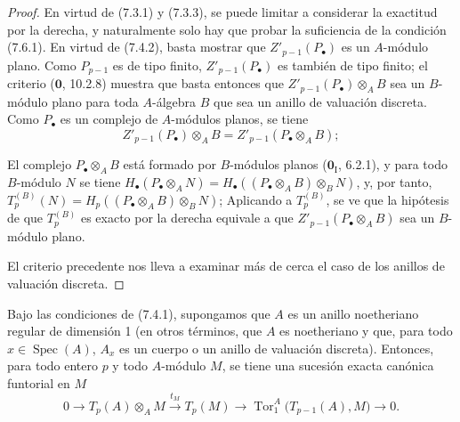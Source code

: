 \begin{proof}
En virtud de (7.3.1) y (7.3.3), se puede limitar a considerar la exactitud por la
derecha, y naturalmente solo hay que probar la suficiencia de la condición
(7.6.1). En virtud de (7.4.2), basta mostrar que
$Z'_{p-1}(P_\bullet)$ es un
$A$-módulo plano. Como $P_{p-1}$ es de tipo finito,
$Z'_{p-1}(P_\bullet)$ es también de tipo finito; el criterio ($\mathbf{0}$, 10.2.8) muestra
que basta entonces que $Z'_{p-1}(P_\bullet)\otimes_A B$
sea un $B$-módulo plano para toda $A$-álgebra $B$ que sea un anillo
de valuación discreta. Como $P_\bullet$ es un complejo de
$A$-módulos planos, se tiene
\[
  Z'_{p-1}(P_\bullet)\otimes_A B
  =
  Z'_{p-1}(P_\bullet\otimes_A B);
\]

El complejo $P_\bullet\otimes_A B$ está formado por $B$-módulos planos
($\mathbf{0}_{\mathrm I}$, 6.2.1), y para todo $B$-módulo $N$ se tiene
$H_\bullet(P_\bullet\otimes_A N)=H_\bullet((P_\bullet\otimes_A B)\otimes_B N)$,
y, por tanto,
$T_p^{(B)}(N)=H_p((P_\bullet\otimes_A B)\otimes_B N)$;
Aplicando  a $T_p^{(B)}$, se ve que la hipótesis de
que $T_p^{(B)}$ es exacto por la derecha equivale a que
$Z'_{p-1}(P_\bullet\otimes_A B)$ sea un $B$-módulo plano.

El criterio precedente nos lleva a examinar más de cerca el caso de
los anillos de valuación discreta.
\end{proof}

\begin{proposition}[7.6.3]
Bajo las condiciones de \textup{(7.4.1)}, supongamos que $A$ es un anillo noetheriano
regular de dimensión 1 (en otros términos, que $A$ es noetheriano y que, para todo
$x\in\operatorname{Spec}(A)$, $A_x$ es un cuerpo o un anillo de valuación
discreta). Entonces, para todo entero $p$ y todo $A$-módulo $M$, se tiene una sucesión
exacta canónica funtorial en $M$
\[
  0
  \longrightarrow T_p(A)\otimes_A M
  \xrightarrow{t_M}T_p(M)
  \longrightarrow \operatorname{Tor}_1^A\bigl(T_{p-1}(A),M\bigr)
  \longrightarrow0.
  \tag{7.6.3.1}\label{III.7.6.3.1.fr}
\]
\end{proposition}

